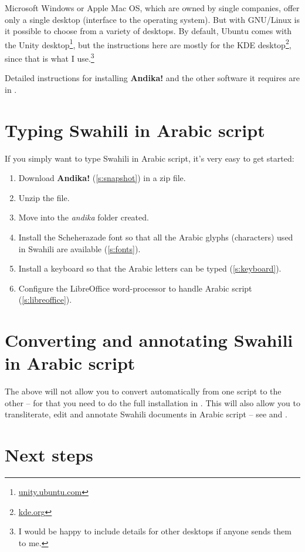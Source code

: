 Microsoft Windows or Apple Mac OS, which are owned by single companies, offer only a single desktop (interface to the operating system).  But with GNU/Linux is it possible to choose from a variety of desktops.  By default, Ubuntu comes with the Unity desktop\footnote{\url{unity.ubuntu.com}}, but the instructions here are mostly for the KDE desktop\footnote{\url{kde.org}}, since that is what I use.\footnote{I would be happy to include details for other desktops if anyone sends them to me.} 

Detailed instructions for installing \textbf{Andika!} and the other software it requires are in .

\section{Typing Swahili in Arabic script}

If you simply want to type Swahili in Arabic script, it's very easy to get started:
\begin{enumerate}
\item Download \textbf{Andika!} (\ref{s:snapshot}) in a zip file.
\item Unzip the file.
\item Move into the \textit{andika} folder created.
\item Install the Scheherazade font so that all the Arabic glyphs (characters) used in Swahili are available (\ref{s:fonts}).
\item Install a keyboard so that the Arabic letters can be typed (\ref{s:keyboard}).
\item Configure the LibreOffice word-processor to handle Arabic script (\ref{s:libreoffice}).
\end{enumerate}

\section{Converting and annotating Swahili in Arabic script}

The above will not allow you to convert automatically from one script to the other -- for that you need to do the full installation in .  This will also allow you to transliterate, edit and annotate Swahili documents in Arabic script -- see   and .

\section{Next steps}

